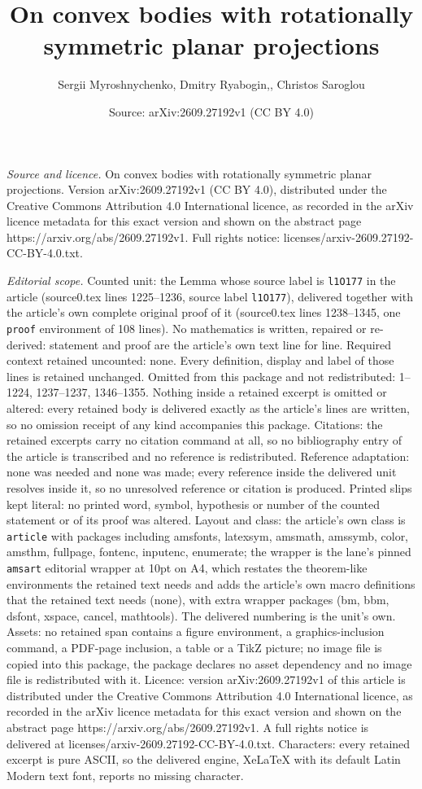 \documentclass[10pt,a4paper]{amsart}
\title[On convex bodies with rotationally symmetric planar projecti]{On convex bodies with rotationally symmetric planar projections}
\author{Sergii Myroshnychenko, Dmitry Ryabogin,, Christos Saroglou}
\date{Source: arXiv:2609.27192v1 (CC BY 4.0)}
\begin{document}
\maketitle

\noindent\emph{Source and licence.} On convex bodies with rotationally symmetric planar projections. Version arXiv:2609.27192v1 (CC BY 4.0), distributed under the Creative Commons Attribution 4.0 International licence, as recorded in the arXiv licence metadata for this exact version and shown on the abstract page https://arxiv.org/abs/2609.27192v1. Full rights notice: licenses/arxiv-2609.27192-CC-BY-4.0.txt.\par\smallskip

\noindent\textit{Editorial scope.} Counted unit: the Lemma whose source label is \texttt{l1O177} in the article (source0.tex lines 1225--1236, source label \texttt{l1O177}), delivered together with the article's own complete original proof of it (source0.tex lines 1238--1345, one \texttt{proof} environment of 108 lines). No mathematics is written, repaired or re-derived: statement and proof are the article's own text line for line. Required context retained uncounted: none. Every definition, display and label of those lines is retained unchanged. Omitted from this package and not redistributed: 1--1224, 1237--1237, 1346--1355. Nothing inside a retained excerpt is omitted or altered: every retained body is delivered exactly as the article's lines are written, so no omission receipt of any kind accompanies this package. Citations: the retained excerpts carry no citation command at all, so no bibliography entry of the article is transcribed and no reference is redistributed. Reference adaptation: none was needed and none was made; every reference inside the delivered unit resolves inside it, so no unresolved reference or citation is produced. Printed slips kept literal: no printed word, symbol, hypothesis or number of the counted statement or of its proof was altered. Layout and class: the article's own class is \texttt{article} with packages including amsfonts, latexsym, amsmath, amssymb, color, amsthm, fullpage, fontenc, inputenc, enumerate; the wrapper is the lane's pinned \texttt{amsart} editorial wrapper at 10pt on A4, which restates the theorem-like environments the retained text needs and adds the article's own macro definitions that the retained text needs (none), with extra wrapper packages (bm, bbm, dsfont, xspace, cancel, mathtools). The delivered numbering is the unit's own. Assets: no retained span contains a figure environment, a graphics-inclusion command, a PDF-page inclusion, a table or a TikZ picture; no image file is copied into this package, the package declares no asset dependency and no image file is redistributed with it. Licence: version arXiv:2609.27192v1 of this article is distributed under the Creative Commons Attribution 4.0 International licence, as recorded in the arXiv licence metadata for this exact version and shown on the abstract page https://arxiv.org/abs/2609.27192v1. A full rights notice is delivered at licenses/arxiv-2609.27192-CC-BY-4.0.txt. Characters: every retained excerpt is pure ASCII, so the delivered engine, XeLaTeX with its default Latin Modern text font, reports no missing character.
\end{document}

